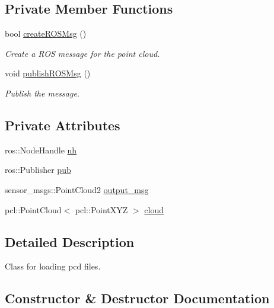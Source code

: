 \subsection*{Private Member Functions}
\begin{DoxyCompactItemize}
\item 
bool \hyperlink{classload__pcd__node_1_1_load_p_c_d_a348ad9f9fe614a37668a22b1e9df62d9}{create\+R\+O\+S\+Msg} ()
\begin{DoxyCompactList}\small\item\em Create a R\+OS message for the point cloud. \end{DoxyCompactList}\item 
void \hyperlink{classload__pcd__node_1_1_load_p_c_d_a89f19ca70940a64932d6ef61c68b83a1}{publish\+R\+O\+S\+Msg} ()
\begin{DoxyCompactList}\small\item\em Publish the message. \end{DoxyCompactList}\end{DoxyCompactItemize}
\subsection*{Private Attributes}
\begin{DoxyCompactItemize}
\item 
ros\+::\+Node\+Handle \hyperlink{classload__pcd__node_1_1_load_p_c_d_a33ce71ddb911163b7bdc79cdf0fbb7b6}{nh}
\item 
ros\+::\+Publisher \hyperlink{classload__pcd__node_1_1_load_p_c_d_adfa7998324e0fcdc7764603ae08b10c2}{pub}
\item 
sensor\+\_\+msgs\+::\+Point\+Cloud2 \hyperlink{classload__pcd__node_1_1_load_p_c_d_acc6a98852ea5ac45864ccee88ba09193}{output\+\_\+msg}
\item 
pcl\+::\+Point\+Cloud$<$ pcl\+::\+Point\+X\+YZ $>$ \hyperlink{classload__pcd__node_1_1_load_p_c_d_a43f6fe470fc4ef15e34fa79e4c91e620}{cloud}
\end{DoxyCompactItemize}


\subsection{Detailed Description}
Class for loading pcd files. 

\subsection{Constructor \& Destructor Documentation}
